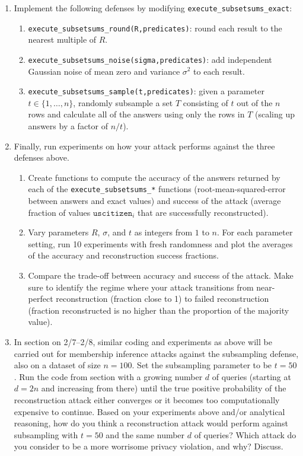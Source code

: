 \documentclass[11pt]{article}
\newcommand{\us}{\texttt{uscitizen}}
\begin{document}
\begin{enumerate}[leftmargin=*]
\begin{enumerate}
			\item Implement the following defenses by modifying \texttt{execute\_subsetsums\_exact}:  
			\begin{enumerate}
				\item \texttt{execute\_subsetsums\_round(R,predicates)}: round each result to the nearest multiple of $R$. 
				\item \texttt{execute\_subsetsums\_noise(sigma,predicates)}:  add independent Gaussian noise of mean zero and variance $\sigma^2$ to each result.
				\item\texttt{execute\_subsetsums\_sample(t,predicates)}: given a parameter $t\in \{1,\ldots,n\}$, randomly subsample a set $T$ consisting of $t$ out of the $n$ rows and calculate all of the answers using only the rows in $T$ (scaling up answers by a factor of $n/t$). 
			\end{enumerate}
			\item Finally, run experiments on how your attack performs against the three defenses above.

			\begin{enumerate}
				\item Create functions to compute the accuracy of the answers returned by each of the \texttt{execute\_subsetsums\_*} functions
				(root-mean-squared-error between answers and exact values) and success of the attack (average fraction of values $\us_i$ that are successfully reconstructed).
				\item Vary parameters $R$, $\sigma$, and $t$ as integers from $1$ to $n$.
				For each parameter setting, run 10 experiments with fresh randomness and plot the averages of the accuracy and reconstruction success fractions. 
				\item Compare the trade-off between accuracy and success of the attack. 
				Make sure to identify the regime where your attack transitions from near-perfect reconstruction (fraction close to 1) to failed reconstruction (fraction reconstructed is no higher than the proportion of the majority value). 

			\end{enumerate}
			
			\item In section on 2/7--2/8, similar coding and experiments as above will be carried out for membership inference attacks against the subsampling defense, also on a dataset of size $n=100$.  Set the subsampling parameter to be $t=50$. Run the code from section with a growing number $d$ of queries (starting at $d=2n$ and increasing from there) until the true positive probability of the reconstruction attack either converges or it becomes too computationally expensive to continue.  Based on your experiments above and/or analytical reasoning, how do you think a reconstruction attack would perform against subsampling with $t=50$ and the same number $d$ of queries?  Which attack do you consider to be a more worrisome privacy violation, and why? Discuss.
		\end{enumerate}
		


\end{enumerate}
\end{document}
